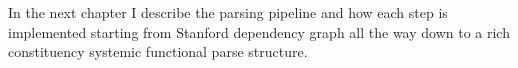 In the next chapter I describe the parsing pipeline and how each step is implemented starting from Stanford dependency graph all the way down to a rich constituency systemic functional parse structure.





